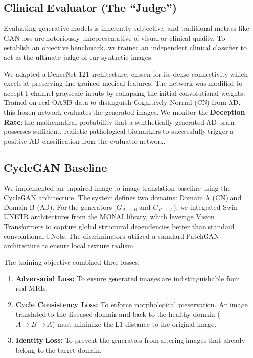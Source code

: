 \documentclass[conference]{IEEEtran}
\begin{document}
\subsection{Clinical Evaluator (The ``Judge'')}
Evaluating generative models is inherently subjective, and traditional metrics like GAN loss are notoriously unrepresentative of visual or clinical quality. To establish an objective benchmark, we trained an independent clinical classifier to act as the ultimate judge of our synthetic images.

We adapted a DenseNet-121 architecture, chosen for its dense connectivity which excels at preserving fine-grained medical features. The network was modified to accept 1-channel grayscale inputs by collapsing the initial convolutional weights. Trained on real OASIS data to distinguish Cognitively Normal (CN) from AD, this frozen network evaluates the generated images. We monitor the \textbf{Deception Rate}: the mathematical probability that a synthetically generated AD brain possesses sufficient, realistic pathological biomarkers to successfully trigger a positive AD classification from the evaluator network.

\subsection{CycleGAN Baseline}
We implemented an unpaired image-to-image translation baseline using the CycleGAN architecture. The system defines two domains: Domain A (CN) and Domain B (AD). 
For the generators ($G_{A \to B}$ and $G_{B \to A}$), we integrated Swin UNETR architectures from the MONAI library, which leverage Vision Transformers to capture global structural dependencies better than standard convolutional UNets. The discriminators utilized a standard PatchGAN architecture to ensure local texture realism.

The training objective combined three losses:
\begin{enumerate}
    \item \textbf{Adversarial Loss:} To ensure generated images are indistinguishable from real MRIs.
    \item \textbf{Cycle Consistency Loss:} To enforce morphological preservation. An image translated to the diseased domain and back to the healthy domain ($A \to B \to A$) must minimize the L1 distance to the original image.
    \item \textbf{Identity Loss:} To prevent the generators from altering images that already belong to the target domain.
\end{enumerate}
\end{document}
